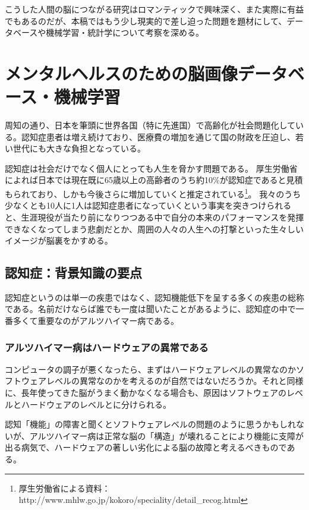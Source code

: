 こうした人間の脳につながる研究はロマンティックで興味深く、また実際に有益でもあるのだが、本稿ではもう少し現実的で差し迫った問題を題材にして、データベースや機械学習・統計学について考察を深める。

\section{メンタルヘルスのための脳画像データベース・機械学習}
周知の通り、日本を筆頭に世界各国（特に先進国）で高齢化が社会問題化している。認知症患者は増え続けており、医療費の増加を通じて国の財政を圧迫し、若い世代にも大きな負担となっている。

認知症は社会だけでなく個人にとっても人生を脅かす問題である。
厚生労働省によれば日本では現在既に65歳以上の高齢者のうち約10\%が認知症であると見積もられており、しかも今後さらに増加していくと推定されている\footnote{厚生労働省による資料：http://www.mhlw.go.jp/kokoro/speciality/detail\_recog.html
}。
我々のうち少なくとも10人に1人は認知症患者になっていくという事実を突きつけられると、生涯現役が当たり前になりつつある中で自分の本来のパフォーマンスを発揮できなくなってしまう悲劇だとか、周囲の人々の人生への打撃といった生々しいイメージが脳裏をかすめる。

\subsection{認知症：背景知識の要点}
認知症というのは単一の疾患ではなく、認知機能低下を呈する多くの疾患の総称である。名前だけならば誰でも一度は聞いたことがあるように、認知症の中で一番多くて重要なのがアルツハイマー病である。

\subsubsection{アルツハイマー病はハードウェアの異常である}
コンピュータの調子が悪くなったら、まずはハードウェアレベルの異常なのかソフトウェアレベルの異常なのかを考えるのが自然ではないだろうか。それと同様に、長年使ってきた脳がうまく動かなくなる場合も、原因はソフトウェアのレベルとハードウェアのレベルとに分けられる。

認知「機能」の障害と聞くとソフトウェアレベルの問題のように思うかもしれないが、アルツハイマー病は正常な脳の「構造」が壊れることにより機能に支障が出る病気で、ハードウェアの著しい劣化による脳の故障と考えるべきものである。

